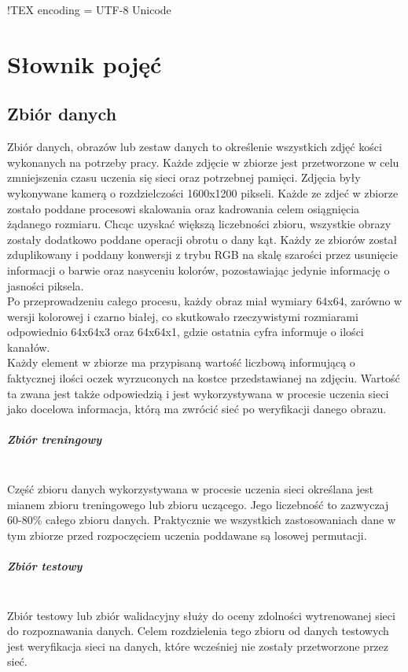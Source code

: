 !TEX encoding = UTF-8 Unicode

\chapter{Słownik pojęć}
\section{Zbiór danych}
Zbiór danych, obrazów lub zestaw danych to określenie wszystkich zdjęć kości wykonanych na
potrzeby pracy. Każde zdjęcie w zbiorze jest przetworzone w celu zmniejszenia czasu uczenia
się sieci oraz potrzebnej pamięci. Zdjęcia były wykonywane kamerą o rozdzielczości 1600x1200
pikseli. Każde ze zdjeć w zbiorze zostało poddane procesowi skalowania oraz kadrowania celem
osiągnięcia żądanego rozmiaru. Chcąc uzyskać większą liczebności zbioru, wszystkie obrazy
zostały dodatkowo poddane operacji obrotu o dany kąt. Każdy ze zbiorów został zduplikowany
i poddany konwersji z trybu RGB na skalę szarości przez usunięcie informacji o barwie
oraz nasyceniu kolorów, pozostawiając jedynie informację o jasności piksela.\\
Po przeprowadzeniu całego procesu, każdy obraz miał wymiary 64x64, zarówno w wersji
kolorowej i czarno białej, co skutkowało rzeczywistymi rozmiarami odpowiednio 64x64x3
oraz 64x64x1, gdzie ostatnia cyfra informuje o ilości kanałów.\\
Każdy element w zbiorze ma przypisaną wartość liczbową informującą o faktycznej ilości
oczek wyrzuconych na kostce przedstawianej na zdjęciu. Wartość ta zwana jest także
odpowiedzią i jest wykorzystywana w procesie uczenia sieci jako docelowa informacja,
którą ma zwrócić sieć po weryfikacji danego obrazu.

\paragraph{Zbiór treningowy} \mbox{}\\
Część zbioru danych wykorzystywana w procesie uczenia sieci określana jest mianem zbioru
treningowego lub zbioru uczącego. Jego liczebność to zazwyczaj 60-80\% całego zbioru danych.
Praktycznie we wszystkich zastosowaniach dane w tym zbiorze przed rozpoczęciem uczenia
poddawane są losowej permutacji.

\paragraph{Zbiór testowy} \mbox{}\\
Zbiór testowy lub zbiór walidacyjny służy do oceny zdolności wytrenowanej sieci do
rozpoznawania danych. Celem rozdzielenia tego zbioru od danych testowych jest weryfikacja
sieci na danych, które wcześniej nie zostały przetworzone przez sieć.

